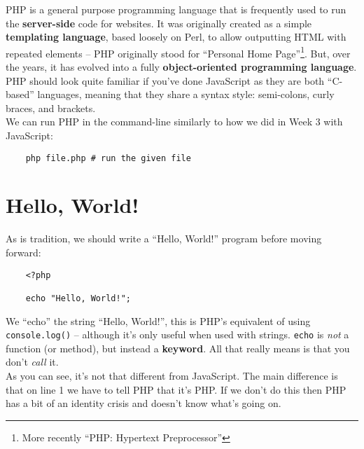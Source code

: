 
PHP is a general purpose programming language that is frequently used to run the \textbf{server-side} code for websites. It was originally created as a simple \textbf{templating language}, based loosely on Perl, to allow outputting HTML with repeated elements – PHP originally stood for ``Personal Home Page''\footnote{More recently ``PHP: Hypertext Preprocessor''}. But, over the years, it has evolved into a fully \textbf{object-oriented programming language}.
\\

PHP should look quite familiar if you've done JavaScript as they are both ``C-based'' languages, meaning that they share a syntax style: semi-colons, curly braces, and brackets.
\\

We can run PHP in the command-line similarly to how we did in Week 3 with JavaScript:

\begin{verbatim}
    php file.php # run the given file
\end{verbatim}


\section{Hello, World!}

As is tradition, we should write a ``Hello, World!'' program before moving forward:

\begin{verbatim}
    <?php

    echo "Hello, World!";
\end{verbatim}

We ``echo'' the string ``Hello, World!'', this is PHP's equivalent of using \texttt{console.log()} – although it's only useful when used with strings. \texttt{echo} is \textit{not} a function (or method), but instead a \textbf{keyword}. All that really means is that you don't \textit{call} it.
\\

As you can see, it's not that different from JavaScript. The main difference is that on line 1 we have to tell PHP that it's PHP. If we don't do this then PHP has a bit of an identity crisis and doesn't know what's going on.
\\

